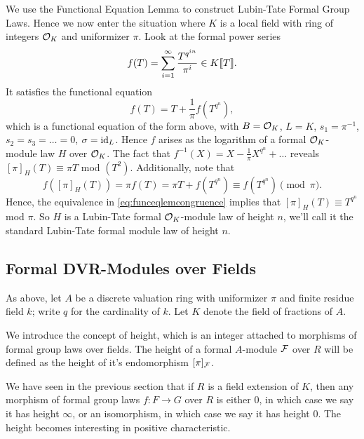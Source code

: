 \documentclass[../main.tex]{subfiles}
\begin{document}
We use the Functional Equation Lemma to construct Lubin-Tate Formal Group Laws. 
Hence we now enter the situation where $K$ is a local field with ring of integers
$\mathcal{O}_K$ and uniformizer $\pi$. Look at the formal power series
\begin{equation*}
  f(T) = \sum_{i=1}^\infty \frac{T^{q^{in}}}{\pi^i} \in K\llbracket T \rrbracket.
\end{equation*}
It satisfies the functional equation
\begin{equation*}
  f(T) = T + \frac 1\pi f(T^{q^n}),
\end{equation*}
which is a functional equation of the form above, with 
$B = \mathcal{O}_K$, $L = K$, $s_1 = \pi^{-1}$, $s_2 = s_3 = \dots = 0$, $\sigma = \operatorname{id}_L$. 
Hence $f$ arises as the logarithm of a formal $\mathcal{O}_K$-module law $H$ over $\mathcal{O}_K$.
The fact that $f^{-1}(X) = X - \frac 1\pi X^{q^n} + \dots$ reveals
$[\pi]_H(T) \equiv \pi T$ mod $(T^2)$. Additionally, note that 
\begin{equation*}
  f([\pi]_H(T)) = \pi f(T) = \pi T + f(T^{q^n}) \equiv f(T^{q^n}) \pmod \pi.
\end{equation*}
Hence, the equivalence in \eqref{eq:funceqlemcongruence} implies that 
$[\pi]_H(T) \equiv T^{q^n}$ mod $\pi$. So $H$ is a Lubin-Tate formal $\mathcal{O}_K$-module
law of height $n$, we'll call it the standard Lubin-Tate formal module law of
height $n$. 



\subsection{Formal DVR-Modules over Fields} %
\label{sub:Formal DVR-Modules over Fields}
As above, let $A$ be a discrete valuation ring with uniformizer $\pi$ and finite 
residue field $k$; write $q$ for the cardinality of $k$. Let $K$ denote the
field of fractions of $A$.

We introduce the concept of height, which is an integer attached to
morphisms of formal group laws over fields. The height of a formal $A$-module
$\mathcal{F}$ over $R$ will be defined as the height of it's endomorphism $[\pi]_{\mathcal{F}}$. 

We have seen in the previous section that if $R$ is a field extension of $K$,
then any morphism of formal group laws $f: F \to G$ over $R$ is either $0$, in
which case we say it has height $\infty$, or an isomorphism, in which case we
say it has height $0$. The height becomes interesting in positive
characteristic. 
\end{document}

